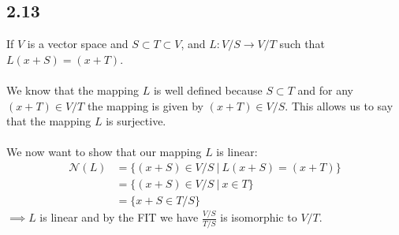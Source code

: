 \documentclass[letterpaper,12pt]{article}
\theoremstyle{definition}
\begin{document}
\subsection*{2.13}
If $V$ is a vector space and $S \subset T \subset V$, and $L: V/S \rightarrow V/T$ such
that \\$
L(x+S)=(x+T)$. \\ \\
We know that the mapping $L$ is well defined because $S \subset T$ and for any 
$(x + T)\in V/T$ the mapping is given by $(x+T)\in V/S$. This allows us to say that
the mapping $L$ is surjective. \\
\\
We now want to show that our mapping $L$ is linear:
\begin{align*}
    \mathscr{N}(L) &= \{ (x + S) \in V/S ~|~ L(x+S)=(x+T)\} \\
    &= \{ (x+S) \in V/S ~|~ x \in T \} \\
    &= \{ x+S \in T/S\}
\end{align*}
$\implies L$ is linear and by the FIT we have
$\frac{V/S}{T/S}$ is isomorphic to $V/T$.
\end{document}

